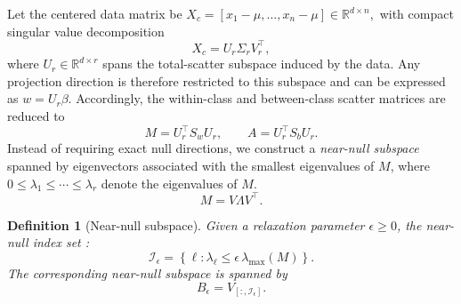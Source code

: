 \documentclass[final,twocolumn,10pt]{elsarticle}
\newtheorem{definition}{Definition}
\begin{document}
Let the centered data matrix be $X_c=[x_1-\mu,\ldots,x_n-\mu]\in\mathbb{R}^{d\times n},$
with compact singular value decomposition
\begin{equation}
X_c = U_r \Sigma_r V_r^\top ,
\label{eq:svd_XXX_revised}
\end{equation}
where \(U_r\in\mathbb{R}^{d\times r}\) spans the total-scatter subspace induced by the data. Any projection direction is therefore restricted to this subspace and can be expressed as \(w = U_r \beta\). Accordingly, the within-class and between-class scatter matrices are reduced to
\begin{equation}
M = U_r^\top S_w U_r, 
\qquad 
A = U_r^\top S_b U_r .
\label{eq:reduced_scatter_XXX}
\end{equation}
Instead of requiring exact null directions, we construct a \emph{near-null subspace} spanned by eigenvectors associated with the smallest eigenvalues of \(M\), where \(0 \le \lambda_1 \le \cdots \le \lambda_r\) denote the eigenvalues of \(M\). 
\[
M = V \Lambda V^\top .
\]









\begin{definition}[Near-null subspace]
Given a relaxation parameter \(\epsilon \ge 0\), the near-null index set :
\begin{equation}
\mathcal{I}_\epsilon =
\left\{\ell : \lambda_\ell \le \epsilon\,\lambda_{\max}(M)\right\}.
\label{eq:near_null_index_XXX}
\end{equation}
The corresponding near-null subspace is spanned by
\[
B_\epsilon = V_{[:,\mathcal{I}_\epsilon]} .
\]
\end{definition}
\end{document}
